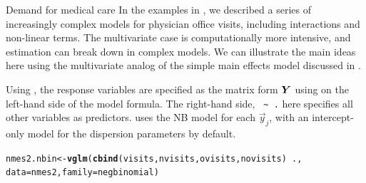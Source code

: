 \documentclass[11pt]{book}\usepackage[]{graphicx}\usepackage[]{color}
\makeatletter
\newcommand{\hlopt}[1]{\textcolor[rgb]{0,0,0}{#1}}%
\newcommand{\hlstd}[1]{\textcolor[rgb]{0.345,0.345,0.345}{#1}}%
\newcommand{\hlkwb}[1]{\textcolor[rgb]{0.69,0.353,0.396}{#1}}%
\newcommand{\hlkwc}[1]{\textcolor[rgb]{0.333,0.667,0.333}{#1}}%
\newcommand{\hlkwd}[1]{\textcolor[rgb]{0.737,0.353,0.396}{\textbf{#1}}}%
\newenvironment{kframe}{%
 \def\at@end@of@kframe{}%
 \ifinner\ifhmode%
  \def\at@end@of@kframe{\end{minipage}}%
  \begin{minipage}{\columnwidth}%
 \fi\fi%
 \def\FrameCommand##1{\hskip\@totalleftmargin \hskip-\fboxsep
 \colorbox{shadecolor}{##1}\hskip-\fboxsep
     \hskip-\linewidth \hskip-\@totalleftmargin \hskip\columnwidth}%
 \MakeFramed {\advance\hsize-\width
   \@totalleftmargin\z@ \linewidth\hsize
   \@setminipage}}%
 {\par\unskip\endMakeFramed%
 \at@end@of@kframe}
\newenvironment{knitrout}{}{} %
\renewenvironment{knitrout}{\small\renewcommand{\baselinestretch}{.85}}{} %
\makeatother
\begin{document}
\begin{Example}[nmes5]{Demand for medical care}
In the examples in , we described a series of increasingly
complex models for physician office visits, including interactions and non-linear terms.
The multivariate case is computationally more intensive, and estimation can break down in
complex models. We can illustrate the main ideas here using the multivariate analog of the
simple main effects model discussed in .

Using , the response variables are specified as the matrix form $\bm{Y}$
using  on the left-hand side of the model formula.  The right-hand side,
\verb| ~ .| here specifies all other variables as predictors.
 uses the NB model for each $\vec{y}_j$, with an intercept-only
model for the dispersion parameters by default.

\begin{knitrout}
\color{fgcolor}\begin{kframe}
\begin{alltt}
\hlstd{nmes2.nbin} \hlkwb{<-} \hlkwd{vglm}\hlstd{(}\hlkwd{cbind}\hlstd{(visits, nvisits, ovisits, novisits)} \hlopt{~} \hlstd{.,}
                   \hlkwc{data} \hlstd{= nmes2,} \hlkwc{family} \hlstd{= negbinomial)}
\end{alltt}
\end{kframe}
\end{knitrout}


\end{Example}
\end{document}
